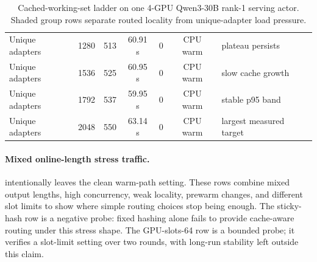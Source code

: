 \documentclass{llmxive}
\begin{document}
\begin{appendices}
\begin{table}[!htbp]
{\begin{tabular}{@{}M{0.20\textwidth}cccccM{0.22\textwidth}@{}}
Unique adapters & 1280 & 513 & 60.91 s & 0 & CPU warm & plateau persists \\
Unique adapters & 1536 & 525 & 60.95 s & 0 & CPU warm & slow cache growth \\
Unique adapters & 1792 & 537 & 59.95 s & 0 & CPU warm & stable p95 band \\
Unique adapters & 2048 & 550 & 63.14 s & 0 & CPU warm & largest measured target \\
\bottomrule
\end{tabular}%
}
\caption{Cached-working-set ladder on one 4-GPU Qwen3-30B rank-1 serving actor. Shaded group rows separate routed locality from unique-adapter load pressure.}
\label{tab:app_cache_ladders}
\end{table}

\paragraph{Mixed online-length stress traffic.}
 intentionally leaves the clean warm-path setting. These rows combine mixed output lengths, high concurrency, weak locality, prewarm changes, and different slot limits to show where simple routing choices stop being enough. The sticky-hash row is a negative probe: fixed hashing alone fails to provide cache-aware routing under this stress shape. The GPU-slots-64 row is a bounded probe; it verifies a slot-limit setting over two rounds, with long-run stability left outside this claim.


\end{appendices}
\end{document}
